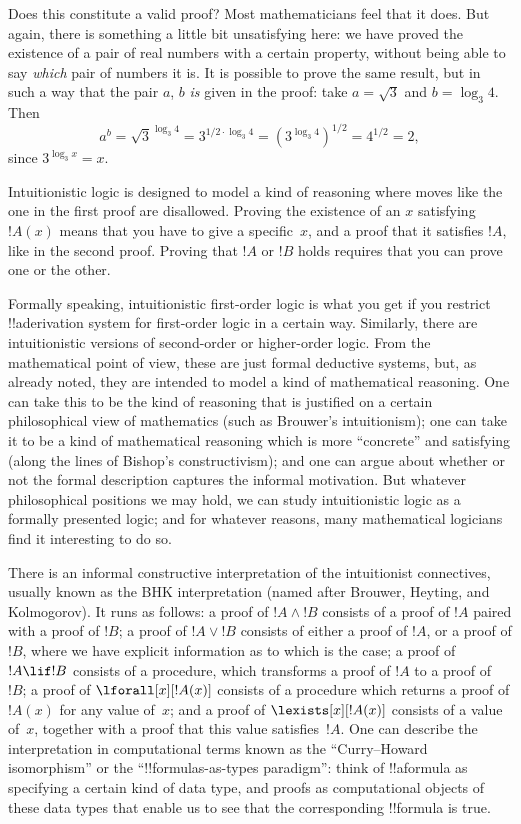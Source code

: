 \documentclass[../../../include/open-logic-section]{subfiles}
\begin{document}
Does this constitute a valid proof? Most mathematicians feel that it
does. But again, there is something a little bit unsatisfying here: we
have proved the existence of a pair of real numbers with a certain
property, without being able to say \emph{which} pair of numbers it
is.  It is possible to prove the same result, but in such a way that
the pair $a$, $b$ \emph{is} given in the proof: take $a = \sqrt{3}$
and $b = \log_3 4$. Then
\[
a^b = \sqrt{3}^{\log_3 4} = 3^{1/2 \cdot \log_3 4} = (3^{\log_3
  4})^{1/2} = 4^{1/2}= 2,
\]
since $3^{\log_3 x} = x$.

Intuitionistic logic is designed to model a kind of reasoning where
moves like the one in the first proof are disallowed. Proving the
existence of an $x$ satisfying~$!A(x)$ means that you have to give a
specific~$x$, and a proof that it satisfies $!A$, like in the second
proof. Proving that $!A$ or $!B$ holds requires that you can prove one
or the other.

Formally speaking, intuitionistic first-order logic is what you get if
you restrict !!a{derivation} system for first-order logic in a certain
way. Similarly, there are intuitionistic versions of second-order or
higher-order logic. From the mathematical point of view, these are
just formal deductive systems, but, as already noted, they are
intended to model a kind of mathematical reasoning. One can take this
to be the kind of reasoning that is justified on a certain
philosophical view of mathematics (such as Brouwer's intuitionism);
one can take it to be a kind of mathematical reasoning which is more
``concrete'' and satisfying (along the lines of Bishop's
constructivism); and one can argue about whether or not the formal
description captures the informal motivation. But whatever
philosophical positions we may hold, we can study intuitionistic logic
as a formally presented logic; and for whatever reasons, many
mathematical logicians find it interesting to do so.

There is an informal constructive interpretation of the intuitionist
connectives, usually known as the BHK interpretation (named after
Brouwer, Heyting, and Kolmogorov). It runs as follows: a proof of $!A
\land !B$ consists of a proof of $!A$ paired with a proof of $!B$; a
proof of $!A \lor !B$ consists of either a proof of $!A$, or a proof
of $!B$, where we have explicit information as to which is the case; a
proof of $!A \lif !B$ consists of a procedure, which transforms a
proof of $!A$ to a proof of~$!B$; a proof of $\lforall[x][!A(x)]$
consists of a procedure which returns a proof of $!A(x)$ for any value
of~$x$; and a proof of $\lexists[x][!A(x)]$ consists of a value
of~$x$, together with a proof that this value satisfies~$!A$. One can
describe the interpretation in computational terms known as the
``Curry--Howard isomorphism'' or the ``!!{formula}s-as-types
paradigm'': think of !!a{formula} as specifying a certain kind of
data type, and proofs as computational objects of these data types
that enable us to see that the corresponding !!{formula} is true.
\end{document}
